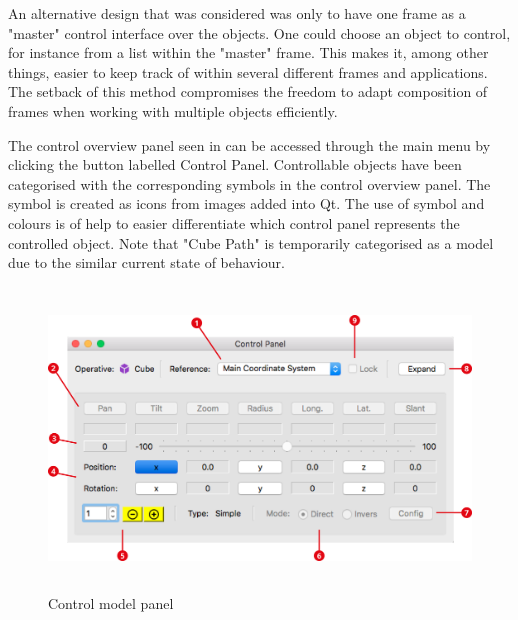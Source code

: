 An alternative design that was considered was only to have one frame as a "master" control interface over the objects. One could choose an object to control, for instance from a list within the "master" frame. This makes it, among other things, easier to keep track of within several different frames and applications. The setback of this method compromises the freedom to adapt composition of frames when working with multiple objects efficiently. 

The control overview panel seen in  can be accessed through the main menu by clicking the button labelled Control Panel.  Controllable objects have been categorised with the corresponding symbols in the control overview panel. The symbol is created as icons from images added into Qt. The use of symbol and colours is of help to easier differentiate which control panel represents the controlled object. Note that "Cube Path" is temporarily categorised as a model due to the similar current state of behaviour.

\begin{figure}[ht]
    \centering
    \includegraphics[height=8cm]{images/general_control_nr.png}
    \caption[Control model panel]{Control model panel}
    \label{fig:ctrgeneral}
\end{figure}

